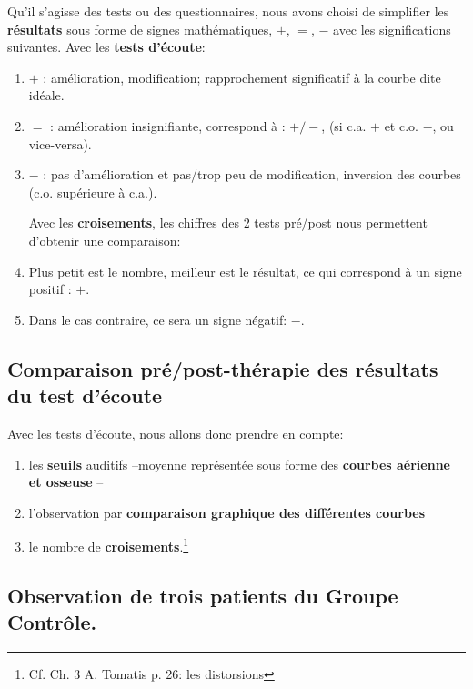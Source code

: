 Qu'il s'agisse des tests ou des questionnaires, nous avons choisi de
simplifier les \textbf{résultats} sous forme de signes
mathématiques, $+$, $=$, $-$ avec les significations suivantes.
Avec les \textbf{tests d'écoute}:
\begin{enumerate}
\item$+$   : amélioration, modification;  rapprochement significatif à la courbe dite idéale.
\item$=$   : amélioration insignifiante, correspond à : $+/-$, (si c.a. $ + $ et c.o. $-$, ou vice-versa).

\item$-$   : pas d'amélioration et pas/trop peu  de modification, inversion
des courbes (c.o. supérieure à c.a.).

  Avec les \textbf{croisements}, les chiffres des 2 tests pré/post
  nous permettent d'obtenir une comparaison:
  \item Plus petit est le nombre, meilleur est le résultat, ce qui correspond à un signe positif : $+$.
\item Dans le
  cas contraire, ce sera un signe négatif: $-$.

\end{enumerate}


 \subsection{ Comparaison pré/post-thérapie des résultats du test d'écoute}
Avec les tests d'écoute, nous
allons donc prendre en compte:

\begin{enumerate}
 \item   les \textbf{seuils} auditifs --moyenne
représentée sous forme des \textbf{courbes aérienne et osseuse} --
\item  l'observation par \textbf{comparaison graphique des différentes
  courbes}
\item le nombre de
\textbf{croisements}.\footnote{Cf. Ch. 3 A. Tomatis p. 26: les distorsions}

\end{enumerate}




  \subsection{Observation de trois patients du Groupe Contrôle.}


